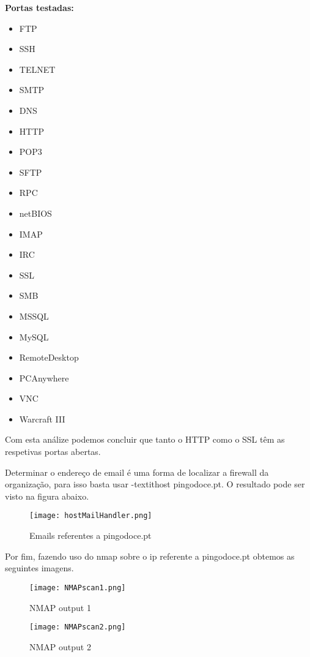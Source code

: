 \par \textbf{Portas testadas:} 
\begin{itemize}
\item FTP
\item SSH
\item TELNET
\item SMTP
\item DNS
\item HTTP
\item POP3
\item SFTP
\item RPC
\item netBIOS
\item IMAP
\item IRC
\item SSL
\item SMB
\item MSSQL
\item MySQL
\item RemoteDesktop
\item PCAnywhere
\item VNC
\item Warcraft III
\end{itemize}

\par Com esta análize podemos concluir que tanto o HTTP como o SSL têm as respetivas portas abertas.\newline


\par Determinar o endereço de email é uma forma de localizar a firewall da organização, para isso basta usar -textit{host pingodoce.pt}. O resultado pode ser visto na figura abaixo.

\begin{figure}[H]

	\centering

 	\texttt{[image: hostMailHandler.png]}
 	\caption {Emails referentes a pingodoce.pt}

  	\label{fig:03}
\end{figure}

\par Por fim, fazendo uso do nmap sobre o ip referente a pingodoce.pt obtemos as seguintes imagens.
 \begin{figure}[H]

	\centering

 	\texttt{[image: NMAPscan1.png]}
 	\caption {NMAP output 1}

  	\label{fig:04}
\end{figure}
\begin{figure}[H]

	\centering

 	\texttt{[image: NMAPscan2.png]}
 	\caption {NMAP output 2}

  	\label{fig:05}
\end{figure}

